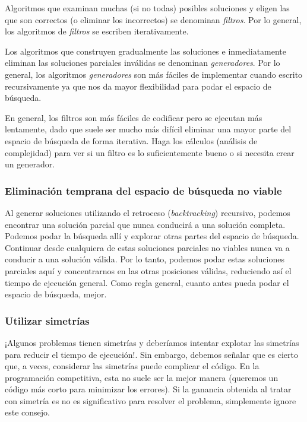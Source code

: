 Algoritmos que examinan muchas (si no todas) posibles soluciones y eligen las que son
correctos (o eliminar los incorrectos) se denominan \emph{filtros}. Por lo general, los algoritmos de \emph{filtros} se escriben iterativamente.

Los algoritmos que construyen gradualmente las soluciones e inmediatamente eliminan las soluciones parciales inválidas se denominan \emph{generadores}. Por lo general, los algoritmos \emph{generadores} son más fáciles de implementar cuando escrito recursivamente ya que nos da mayor flexibilidad para podar el espacio de búsqueda.

En general, los filtros son más fáciles de codificar pero se ejecutan más lentamente, dado que suele ser mucho más difícil eliminar una mayor parte del espacio de búsqueda de forma iterativa. Haga los cálculos (análisis de complejidad) para ver si un filtro es lo suficientemente bueno o si necesita crear un generador.

\subsubsection{Eliminación temprana del espacio de búsqueda no viable }

Al generar soluciones utilizando el retroceso (\emph{backtracking}) recursivo, podemos encontrar una solución parcial que nunca conducirá a una solución completa. Podemos podar la búsqueda allí y explorar otras partes del espacio de búsqueda. Continuar desde cualquiera de estas soluciones parciales no viables nunca va a conducir a una solución válida. Por lo tanto, podemos podar estas soluciones parciales aquí y concentrarnos en las otras posiciones válidas, reduciendo así el tiempo de ejecución general. Como regla general, cuanto antes pueda podar el espacio de búsqueda, mejor.

\subsubsection{Utilizar simetrías}

¡Algunos problemas tienen simetrías y deberíamos intentar explotar las simetrías para reducir el tiempo de ejecución!.  Sin embargo, debemos señalar que es cierto que, a veces, considerar las simetrías puede complicar el código. En la programación competitiva, esta no suele ser la mejor manera (queremos un código más corto para minimizar los errores). Si la ganancia obtenida al tratar con simetría es
no es significativo para resolver el problema, simplemente ignore este consejo.

